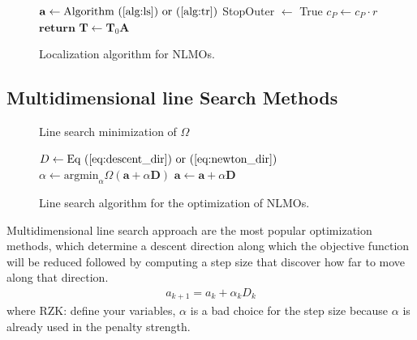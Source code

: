 \documentclass[aps,prl,reprint,amsmath,amssymb]{revtex4-1}
\begin{document}
\begin{figure}
\begin{algorithm}[H]
\begin{algorithmic}[1]
			    \State $\mathbf{a} \gets \text{Algorithm~(\ref{alg:ls}) or~(\ref{alg:tr})}$ 
			\EndIf
			\State StopOuter $\gets$ True
		\EndIf
			\State $c_{P} \gets c_P \cdot r$ 
		\EndIf
	\State $\mathbf{return}$ $\mathbf{T} \gets \mathbf{T}_0 \mathbf{A} $ 
   \end{algorithmic}
\end{algorithm}
\caption{\label{fig:loc_algor} Localization  algorithm for NLMOs.}
\end{figure}


\subsection{Multidimensional line Search Methods}

\begin{figure}
\begin{algorithm}[H]
  \caption{Line search minimization of $\Omega$}
  \label{alg:ls}
   \begin{algorithmic}[1]
	\State $D \gets  \text{Eq~(\ref{eq:descent_dir}) or~(\ref{eq:newton_dir})}$
	\State $\alpha \gets \text{argmin}_{\alpha} \Omega(\mathbf{a} + \alpha \mathbf{D})$ 
	\State $\mathbf{a}\gets \mathbf{a} + \alpha \mathbf{D}$ 
   \end{algorithmic}
\end{algorithm}
\caption{\label{fig:ls} Line search algorithm for the optimization of NLMOs.}
\end{figure}

Multidimensional line search approach are the most popular optimization methods, which determine a descent direction along which the objective function will be reduced followed by computing a step size that discover how far to move along that direction.
%
\begin{equation} \label{eq:LS_methods}
\begin{split} 
a_{k+1} = a_{k} + \alpha_{k}D_{k}
\end{split}
\end{equation}
%
where RZK: define your variables, $\alpha$ is a bad choice for the step size because $\alpha$ is already used in the penalty strength.
\end{document}
